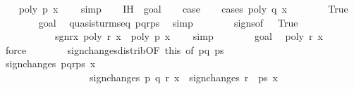 \begin{isabellebody}
\ \ \isamarkupfalse%
\ {\isachardoublequoteopen}poly\ p\ x\ {\isasymnoteq}\ {}{\isachardoublequoteclose}\ \isamarkupfalse%
\ simp\isanewline
\ \ \isamarkupfalse%
\ IH\ {\isacharequal}\ goal{}{\isacharparenleft}{}{\isacharcomma}{}{\isacharcomma}{}{\isacharparenright}\isanewline
\ \ \isamarkupfalse%
\ {\isacharquery}case\isanewline
\ \ \isamarkupfalse%
\ {\isacharparenleft}cases\ {\isachardoublequoteopen}poly\ q\ x\ {\isacharequal}\ {}{\isachardoublequoteclose}{\isacharparenright}\isanewline
\ \ \ \ \isamarkupfalse%
\ True\isanewline
\ \ \ \ \ \ \isamarkupfalse%
\ goal{}\ \isamarkupfalse%
\ quasi{\isacharunderscore}sturm{\isacharunderscore}seq\ {\isachardoublequoteopen}p{\isacharhash}q{\isacharhash}r{\isacharhash}ps{\isachardoublequoteclose}\ \isamarkupfalse%
\ simp\isanewline
\ \ \ \ \ \ \isamarkupfalse%
\ signs{\isacharbrackleft}of\ {}{\isacharbrackright}\ \ True\ \isamarkupfalse%
\ \isanewline
\ \ \ \ \ \ \ \ \ \ \ sgn{\isacharunderscore}r{\isacharunderscore}x{}{\isacharcolon}\ {\isachardoublequoteopen}poly\ r\ x\ {\isacharasterisk}\ poly\ p\ x\ {\isacharless}\ {}{\isachardoublequoteclose}\ \isamarkupfalse%
\ simp\isanewline
\ \ \ \ \ \ \isamarkupfalse%
\ goal{}\ \isamarkupfalse%
\ {\isachardoublequoteopen}poly\ r\ x\ {\isasymnoteq}\ {}{\isachardoublequoteclose}\ \isamarkupfalse%
\ force\isanewline
\ \ \ \ \ \ \isamarkupfalse%
\ sign{\isacharunderscore}changes{\isacharunderscore}distrib{\isacharbrackleft}OF\ this{\isacharcomma}\ of\ {\isachardoublequoteopen}{\isacharbrackleft}p{\isacharcomma}q{\isacharbrackright}{\isachardoublequoteclose}\ ps{\isacharbrackright}\isanewline
\ \ \ \ \ \ \ \ \isamarkupfalse%
\ {\isachardoublequoteopen}sign{\isacharunderscore}changes\ {\isacharparenleft}p{\isacharhash}q{\isacharhash}r{\isacharhash}ps{\isacharparenright}\ x\ {\isacharequal}\isanewline
\ \ \ \ \ \ \ \ \ \ \ \ \ \ \ \ \ \ sign{\isacharunderscore}changes\ {\isacharparenleft}{\isacharbrackleft}p{\isacharcomma}\ q{\isacharcomma}\ r{\isacharbrackright}{\isacharparenright}\ x\ {\isacharplus}\ sign{\isacharunderscore}changes\ {\isacharparenleft}r\ {\isacharhash}\ ps{\isacharparenright}\ x\ \isamarkupfalse%

\end{isabellebody}
